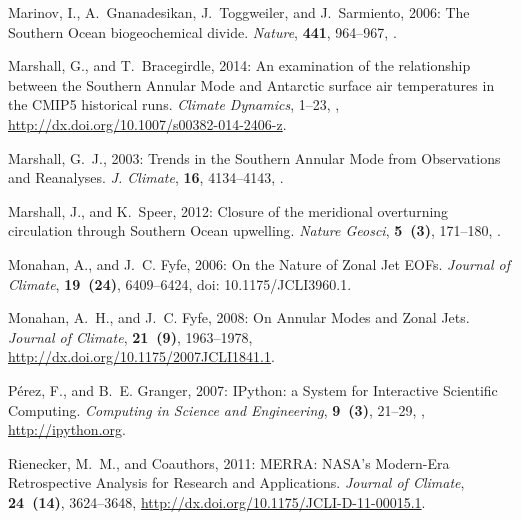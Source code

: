 \documentclass{ametsoc}
\begin{document}
\begin{thebibliography}{53}
Marinov, I., A.~Gnanadesikan, J.~Toggweiler, and J.~Sarmiento, 2006: {The
  {S}outhern {O}cean biogeochemical divide}. \textit{Nature}, \textbf{441},
  964--967, .

Marshall, G., and T.~Bracegirdle, 2014: {An examination of the relationship
  between the Southern Annular Mode and Antarctic surface air temperatures in
  the CMIP5 historical runs}. \textit{Climate Dynamics}, 1--23,
  ,
  \urlprefix\url{http://dx.doi.org/10.1007/s00382-014-2406-z}.

Marshall, G.~J., 2003: {Trends in the {S}outhern {A}nnular {M}ode from
  Observations and Reanalyses}. \textit{J. {C}limate}, \textbf{16}, 4134--4143,
  .

Marshall, J., and K.~Speer, 2012: {Closure of the meridional overturning
  circulation through {S}outhern {O}cean upwelling}. \textit{Nature Geosci},
  \textbf{5~(3)}, 171--180, .

Monahan, A., and J.~C. Fyfe, 2006: {On the Nature of Zonal Jet EOFs}.
  \textit{Journal of Climate}, \textbf{19~(24)}, 6409--6424, doi:
  10.1175/JCLI3960.1.

Monahan, A.~H., and J.~C. Fyfe, 2008: {On Annular Modes and Zonal Jets}.
  \textit{Journal of Climate}, \textbf{21~(9)}, 1963--1978,
  \urlprefix\url{http://dx.doi.org/10.1175/2007JCLI1841.1}.

P{\'e}rez, F., and B.~E. Granger, 2007: {{IP}ython: a System for Interactive
  Scientific Computing}. \textit{Computing in Science and Engineering},
  \textbf{9~(3)}, 21--29, ,
  \urlprefix\url{http://ipython.org}.

Rienecker, M.~M., and Coauthors, 2011: {MERRA: NASA's Modern-Era Retrospective
  Analysis for Research and Applications}. \textit{Journal of Climate},
  \textbf{24~(14)}, 3624--3648,
  \urlprefix\url{http://dx.doi.org/10.1175/JCLI-D-11-00015.1}.


\end{thebibliography}
\end{document}

